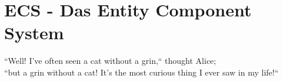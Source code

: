 \section{ECS - Das Entity Component System}\label{sec:ecs}

\vspace{5mm}
\begin{displayquote}
   ``Well! I’ve often seen a cat without a grin,`` thought Alice; \\
    ``but a grin without a cat! It’s the most curious thing I ever saw in my life{!}``
    \par\hfill\cite{Car65}
\end{displayquote}
\vspace{25mm}














